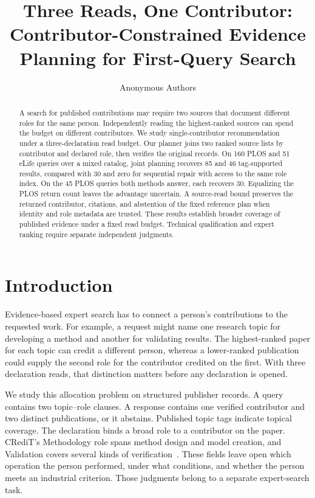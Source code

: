 \documentclass[sigconf,natbib=true,anonymous=true,pbalance=true]{acmart}
\title[Three Reads, One Contributor]{Three Reads, One Contributor: Contributor-Constrained Evidence Planning for First-Query Search}
\author{Anonymous Authors}
\begin{document}
\begin{abstract}
A search for published contributions may require two sources that document different roles for the same person. Independently reading the highest-ranked sources can spend the budget on different contributors. We study single-contributor recommendation under a three-declaration read budget. Our planner joins two ranked source lists by contributor and declared role, then verifies the original records. On 160 PLOS and 51 eLife queries over a mixed catalog, joint planning recovers 85 and 46 tag-supported results, compared with 30 and zero for sequential repair with access to the same role index. On the 45 PLOS queries both methods answer, each recovers 30. Equalizing the PLOS return count leaves the advantage uncertain. A source-read bound preserves the returned contributor, citations, and abstention of the fixed reference plan when identity and role metadata are trusted. These results establish broader coverage of published evidence under a fixed read budget. Technical qualification and expert ranking require separate independent judgments.
\end{abstract}
\maketitle

\section{Introduction}
Evidence-based expert search has to connect a person's contributions to the requested work. For example, a request might name one research topic for developing a method and another for validating results. The highest-ranked paper for each topic can credit a different person, whereas a lower-ranked publication could supply the second role for the contributor credited on the first. With three declaration reads, that distinction matters before any declaration is opened.

We study this allocation problem on structured publisher records. A query contains two topic--role clauses. A response contains one verified contributor and two distinct publications, or it abstains. Published topic tags indicate topical coverage. The declaration binds a broad role to a contributor on the paper. CRediT's Methodology role spans method design and model creation, and Validation covers several kinds of verification~\cite{niso_credit_methodology,niso_credit_validation}. These fields leave open which operation the person performed, under what conditions, and whether the person meets an industrial criterion. Those judgments belong to a separate expert-search task.
\end{document}
